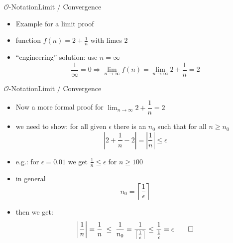 \begin{frame}{$\mathcal{O}$-Notation}{Limit / Convergence}
  \begin{itemize}
  \item Example for a limit proof
  \item function $f(n) = 2 + \frac{1}{n}$ with limes $2$
  \item ``engineering'' solution: use $n=\infty{}$
    \begin{displaymath}
      \frac{1}{\infty}=0 \Rightarrow       \lim_{n \to \infty} f(n)
        = \lim_{n \to \infty} 2 + \dfrac{1}{n}
        = 2
    \end{displaymath}
  \end{itemize}
\end{frame}
\begin{frame}{$\mathcal{O}$-Notation}{Limit / Convergence}
  \begin{itemize}
  \item Now a more formal proof for $\displaystyle\lim_{n \to \infty} 2 +
    \dfrac{1}{n}  = 2$
  \item we need to show: for all given $\epsilon$ there is an $n_0$ such
    that for all $n \geq n_0$
    \begin{displaymath}
      \left| 2 + \dfrac{1}{n} - 2 \right| =  \left| \dfrac{1}{n}  \right| \leq \epsilon
    \end{displaymath}
  \item<2-> e.g.: for $\epsilon=0.01$ we get $\frac{1}{n} \leq \epsilon$
    for $n\geq 100$
  \item<3-> in general
    \begin{displaymath}
      n_0 = \left\lceil \dfrac{1}{\epsilon} \right\rceil
    \end{displaymath}
  \item<4-> then we get:
    \begin{eqnarray*}
      \left|
        \frac{1}{n} \vphantom{\dfrac{1}{\frac{1}{\epsilon}}}
      \right|
        = \dfrac{1}{n}
      \; \leq \;
      \dfrac{1}{n_0} =  \dfrac{1}{\left\lceil\frac{1}{\epsilon}
        \right\rceil}
\leq   \dfrac{1}{\frac{1}{\epsilon}}
        = \epsilon
      \qed
    \end{eqnarray*}
  \end{itemize}
\end{frame}


